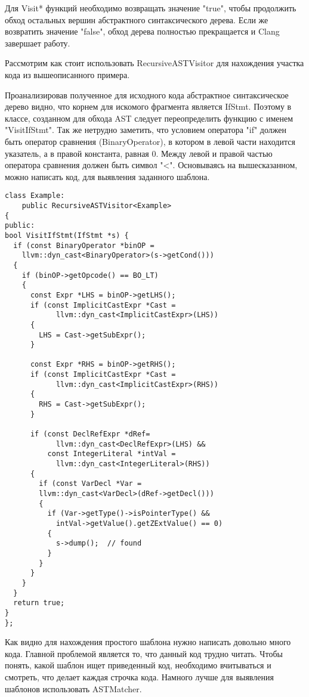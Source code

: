 Для Visit* функций необходимо возвращать значение "true", чтобы продолжить обход остальных вершин
абстрактного синтаксического дерева. Если же возвратить значение "false", обход дерева полностью
прекращается и Clang завершает работу.

Рассмотрим как стоит использовать RecursiveASTVisitor для нахождения участка кода из вышеописанного
примера.

Проанализировав полученное для исходного кода абстрактное синтаксическое дерево видно, что 
корнем для искомого фрагмента является IfStmt. Поэтому в классе, созданном для обхода AST
следует переопределить функцию с именем "VisitIfStmt". Так же нетрудно заметить, что условием 
оператора "if" должен быть оператор сравнения (BinaryOperator), в котором в левой части
находится указатель, а в правой константа, равная 0. Между левой и правой частью оператора сравнения
должен быть символ "<". Основываясь на вышесказанном, можно написать код, для выявления заданного шаблона.
\begin{lstlisting}
class Example:
	public RecursiveASTVisitor<Example> 
{
public:
bool VisitIfStmt(IfStmt *s) {
  if (const BinaryOperator *binOP =
    llvm::dyn_cast<BinaryOperator>(s->getCond())) 
  {
    if (binOP->getOpcode() == BO_LT) 
    {
      const Expr *LHS = binOP->getLHS();
      if (const ImplicitCastExpr *Cast =
            llvm::dyn_cast<ImplicitCastExpr>(LHS)) 
      {
        LHS = Cast->getSubExpr();
      }
      
      const Expr *RHS = binOP->getRHS();
      if (const ImplicitCastExpr *Cast =
            llvm::dyn_cast<ImplicitCastExpr>(RHS)) 
      {
        RHS = Cast->getSubExpr();
      } 

      if (const DeclRefExpr *dRef=
			llvm::dyn_cast<DeclRefExpr>(LHS) &&
		  const IntegerLiteral *intVal = 
			llvm::dyn_cast<IntegerLiteral>(RHS)) 
	  {
        if (const VarDecl *Var =
        llvm::dyn_cast<VarDecl>(dRef->getDecl())) 
        {
          if (Var->getType()->isPointerType() &&
            intVal->getValue().getZExtValue() == 0) 
          {
            s->dump();  // found
          }
        }
      }
    }
  }
  return true;
}
};
\end{lstlisting}

Как видно для нахождения простого шаблона нужно написать довольно много кода. Главной проблемой 
является то, что данный код трудно читать. Чтобы понять, какой шаблон ищет приведенный код,
необходимо вчитываться и смотреть, что делает каждая строчка кода. Намного лучше для выявления 
шаблонов использовать ASTMatcher.


